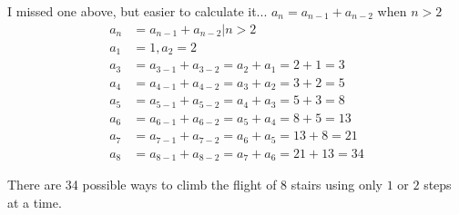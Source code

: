 \documentclass[12pt]{article}
\begin{document}
    I missed one above, but easier to calculate it...
    $ a_n=a_{n-1}+a_{n-2} $ when $n > 2$\\

    \begin{equation}
        \begin{split}
            a_n&=a_{n-1}+a_{n-2} | n>2\\
            a_1&=1,a_2=2\\ 
            a_3&=a_{3-1}+a_{3-2}=a_{2}+a_{1}=2+1=3\\
            a_4&=a_{4-1}+a_{4-2}=a_{3}+a_{2}=3+2=5\\
            a_5&=a_{5-1}+a_{5-2}=a_{4}+a_{3}=5+3=8\\
            a_6&=a_{6-1}+a_{6-2}=a_{5}+a_{4}=8+5=13\\
            a_7&=a_{7-1}+a_{7-2}=a_{6}+a_{5}=13+8=21\\
            a_8&=a_{8-1}+a_{8-2}=a_{7}+a_{6}=21+13=34
        \end{split}
    \end{equation}

    There are 34 possible ways to climb the flight of $8$ stairs using only $1$ or $2$ steps at a time.
\end{document}
